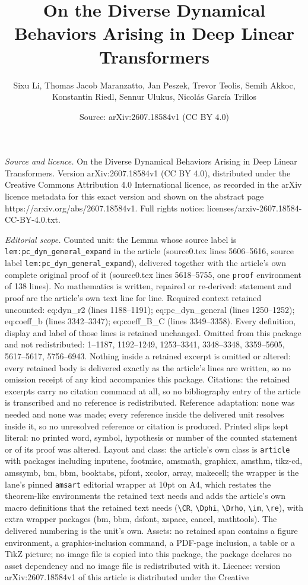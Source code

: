 \documentclass[10pt,a4paper]{amsart}
\title[On the Diverse Dynamical Behaviors Arising in Deep Linear Tr]{On the Diverse Dynamical Behaviors Arising in Deep Linear Transformers}
\author{Sixu Li, Thomas Jacob Maranzatto, Jan Peszek, Trevor Teolis, Semih Akkoc, Konstantin Riedl, Sennur Ulukus, Nicol\'as Garc\'ia Trillos}
\date{Source: arXiv:2607.18584v1 (CC BY 4.0)}
\begin{document}
\maketitle

\noindent\emph{Source and licence.} On the Diverse Dynamical Behaviors Arising in Deep Linear Transformers. Version arXiv:2607.18584v1 (CC BY 4.0), distributed under the Creative Commons Attribution 4.0 International licence, as recorded in the arXiv licence metadata for this exact version and shown on the abstract page https://arxiv.org/abs/2607.18584v1. Full rights notice: licenses/arxiv-2607.18584-CC-BY-4.0.txt.\par\smallskip

\noindent\textit{Editorial scope.} Counted unit: the Lemma whose source label is \texttt{lem:pc\_dyn\_general\_expand} in the article (source0.tex lines 5606--5616, source label \texttt{lem:pc\_dyn\_general\_expand}), delivered together with the article's own complete original proof of it (source0.tex lines 5618--5755, one \texttt{proof} environment of 138 lines). No mathematics is written, repaired or re-derived: statement and proof are the article's own text line for line. Required context retained uncounted: eq:dyn\_r2 (lines 1188--1191); eq:pc\_dyn\_general (lines 1250--1252); eq:coeff\_b (lines 3342--3347); eq:coeff\_B\_C (lines 3349--3358). Every definition, display and label of those lines is retained unchanged. Omitted from this package and not redistributed: 1--1187, 1192--1249, 1253--3341, 3348--3348, 3359--5605, 5617--5617, 5756--6943. Nothing inside a retained excerpt is omitted or altered: every retained body is delivered exactly as the article's lines are written, so no omission receipt of any kind accompanies this package. Citations: the retained excerpts carry no citation command at all, so no bibliography entry of the article is transcribed and no reference is redistributed. Reference adaptation: none was needed and none was made; every reference inside the delivered unit resolves inside it, so no unresolved reference or citation is produced. Printed slips kept literal: no printed word, symbol, hypothesis or number of the counted statement or of its proof was altered. Layout and class: the article's own class is \texttt{article} with packages including inputenc, footmisc, amsmath, graphicx, amsthm, tikz-cd, amssymb, bm, bbm, booktabs, pifont, xcolor, array, makecell; the wrapper is the lane's pinned \texttt{amsart} editorial wrapper at 10pt on A4, which restates the theorem-like environments the retained text needs and adds the article's own macro definitions that the retained text needs (\texttt{\textbackslash CR}, \texttt{\textbackslash Dphi}, \texttt{\textbackslash Drho}, \texttt{\textbackslash im}, \texttt{\textbackslash re}), with extra wrapper packages (bm, bbm, dsfont, xspace, cancel, mathtools). The delivered numbering is the unit's own. Assets: no retained span contains a figure environment, a graphics-inclusion command, a PDF-page inclusion, a table or a TikZ picture; no image file is copied into this package, the package declares no asset dependency and no image file is redistributed with it. Licence: version arXiv:2607.18584v1 of this article is distributed under the Creative 
\end{document}
